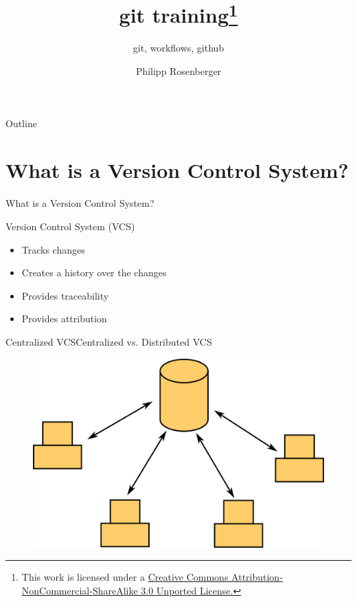 \documentclass[aspectratio=169]{beamer}
\title {git training\footnote{This work is licensed under a \href{http://creativecommons.org/licenses/by-nc-sa/3.0/}{Creative Commons Attribution-NonCommercial-ShareAlike 3.0 Unported License.}}}
\subtitle{git, workflows, github}
\author{Philipp Rosenberger}
\institute{KUNBUS GmbH}
\newcommand{\sectiontitle}{}
\newcommand{\newsection}[1]{\renewcommand{\sectiontitle}{#1}\section{#1}}
\begin{document}
\begin{frame}
\titlepage
\end{frame}

\begin{frame}{Outline}
    \tableofcontents
\end{frame}

\newsection{What is a Version Control System?}
\begin{frame}{\sectiontitle}
\begin{block}{Version Control System (VCS)}
\begin{itemize}
    \item Tracks changes
    \item Creates a history over the changes
    \item Provides traceability
    \item Provides attribution
\end{itemize}
\end{block}
\end{frame}

\begin{frame}{Centralized VCS}{Centralized vs. Distributed VCS}
\begin{figure}
    \centering
    \includegraphics[width=\textwidth,height=0.6\textheight,keepaspectratio]{01_centralized_vcs}
\end{figure}
\end{frame}
\end{document}
